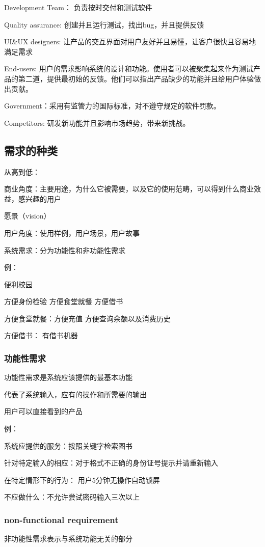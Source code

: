 \documentclass{ctexart}
\begin{document}
Development Team： 负责按时交付和测试软件

Quality assurance: 创建并且运行测试，找出bug，并且提供反馈

UI\&UX designers: 让产品的交互界面对用户友好并且易懂，让客户很快且容易地满足需求

End-users: 用户的需求影响系统的设计和功能。使用者可以被聚集起来作为测试产品的第二道，提供最初始的反馈。他们可以指出产品缺少的功能并且给用户体验做出贡献。

Government：采用有监管力的国际标准，对不遵守规定的软件罚款。

Competitors: 研发新功能并且影响市场趋势，带来新挑战。

\subsection{需求的种类}
从高到低：

商业角度：主要用途，为什么它被需要，以及它的使用范畴，可以得到什么商业效益，感兴趣的用户

愿景（vision）

用户角度：使用样例，用户场景，用户故事

系统需求：分为功能性和非功能性需求

例：

便利校园

方便身份检验  方便食堂就餐  方便借书

方便食堂就餐：方便充值 方便查询余额以及消费历史

方便借书： 有借书机器
\subsubsection{功能性需求}
功能性需求是系统应该提供的最基本功能

代表了系统输入，应有的操作和所需要的输出

用户可以直接看到的产品

例：

系统应提供的服务：按照关键字检索图书

针对特定输入的相应：对于格式不正确的身份证号提示并请重新输入

在特定情形下的行为： 用户5分钟无操作自动锁屏

不应做什么：不允许尝试密码输入三次以上

\subsubsection{non-functional requirement}
非功能性需求表示与系统功能无关的部分
\end{document}

